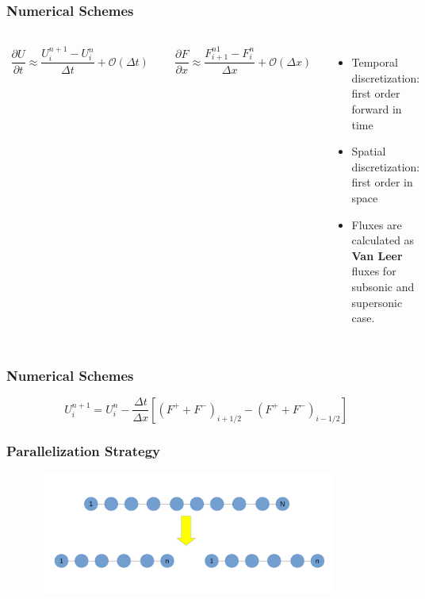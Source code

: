 \documentclass{beamer}
\begin{document}
    \begin{frame}
        \frametitle{Numerical Schemes}
        \begin{columns}
            \begin{align*}
               \dfrac{\partial U}{\partial t} \approx \dfrac{U_i^{n+1}-U_i^n}{\Delta t} + \mathcal{O}(\Delta t)\\
            \end{align*}

            \begin{align*}
                \dfrac{\partial F}{\partial x} \approx \dfrac{F_{i+1}^{n1}-F_{i}^n}{\Delta x} + \mathcal{O}(\Delta x)\\
            \end{align*}


    
            \begin{itemize}
                \item Temporal discretization: first order forward in time 
                \item Spatial discretization: first order in space
                \item Fluxes are calculated as \textbf{Van Leer} fluxes for subsonic and supersonic case. 
            \end{itemize}
            \end{columns}        
    \end{frame}



    \begin{frame}
        \frametitle{Numerical Schemes}
        \begin{equation*}
            U^{n+1}_{i} = U_i^n-\dfrac{\Delta t}{\Delta x}\left[(F^+ + F^-)_{i+1/2}-(F^+ + F^-)_{i-1/2}\right]
        \end{equation*}        
    \end{frame}

    

    \begin{frame}
        \frametitle{Parallelization Strategy}
            \begin{figure}
                \includegraphics[height = 40mm,width = 100mm]{split.png}                
            \end{figure}        
    \end{frame}
\end{document}
